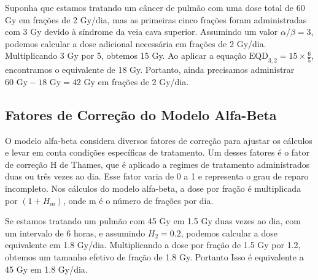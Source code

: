 \documentclass[11pt,a4paper]{article}
\begin{document}
	\begin{tcolorbox}[width=\textwidth, colback={white}, colbacktitle={DarkTurquoise!50!white}, title={$\bigstar$ \LobsterTwo{Exemplo: Cálculo do EQD\textsubscript{2}} $\bigstar$}, coltitle={CarnationPink}, colframe={DarkTurquoise}, fonttitle=\rmfamily\bfseries\Large, breakable]

		Suponha que estamos tratando um câncer de pulmão com uma dose total de 60 Gy em frações de 2 Gy/dia, mas as primeiras cinco frações foram administradas com 3 Gy devido à síndrome da veia cava superior. Assumindo um valor $\alpha/\beta = 3$, podemos calcular a dose adicional necessária em frações de 2 Gy/dia. Multiplicando 3 Gy por 5, obtemos 15 Gy. Ao aplicar a equação $\text{EQD}_{3,2} = 15 \times \frac{6}{5}$, encontramos o equivalente de 18 Gy. Portanto, ainda precisamos administrar $60 \text{ Gy} - 18 \text{ Gy} = 42 \text{ Gy}$ em frações de 2 Gy/dia.

	\end{tcolorbox}

\subsection*{Fatores de Correção do Modelo Alfa-Beta}

	O modelo alfa-beta considera diversos fatores de correção para ajustar os cálculos e levar em conta condições específicas de tratamento. Um desses fatores é o fator de correção H de Thames, que é aplicado a regimes de tratamento administrados duas ou três vezes ao dia. Esse fator varia de 0 a 1 e representa o grau de reparo incompleto. Nos cálculos do modelo alfa-beta, a dose por fração é multiplicada por $(1 + H_m)$, onde m é o número de frações por dia. 
	
	\begin{tcolorbox}[width=\textwidth, colback={white}, colbacktitle={DarkTurquoise!50!white}, title={$\bigstar$ \LobsterTwo{Exemplo: Correção com } $\bigstar$}, coltitle={CarnationPink}, colframe={DarkTurquoise}, fonttitle=\rmfamily\bfseries\Large, breakable]

		Se estamos tratando um pulmão com 45 Gy em 1.5 Gy duas vezes ao dia, com um intervalo de 6 horas, e assumindo $H_2 = 0.2$, podemos calcular a dose equivalente em 1.8 Gy/dia. Multiplicando a dose por fração de 1.5 Gy por 1.2, obtemos um tamanho efetivo de fração de 1.8 Gy. Portanto Isso é equivalente a 45 Gy em 1.8 Gy/dia.

	\end{tcolorbox}
	
\end{document}
